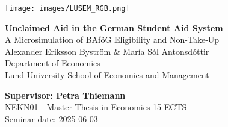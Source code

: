 
\sloppy  %

\texttt{[image: images/LUSEM\_RGB.png]} %

\vspace{2cm}
\begin{center}       
    \vspace*{2cm}
    {\LARGE \textbf{Unclaimed Aid in the German Student Aid System} \\ 
    A Microsimulation of BAföG Eligibility and Non-Take-Up} \\
    \vspace{1cm}
    \Large Alexander Eriksson Byström \& María Sól Antonsdóttir \\[0.3cm]
    \normalsize Department of Economics \\ 
    Lund University School of Economics and Management
\end{center}
\vspace{2cm}

\vfill
\noindent 
\textbf{Supervisor: Petra Thiemann} \\ 
NEKN01 - Master Thesis in Economics 15 ECTS \\ 
Seminar date: 2025-06-03
\thispagestyle{empty}

\fussy  %

\newpage
\tableofcontents
\thispagestyle{empty}




